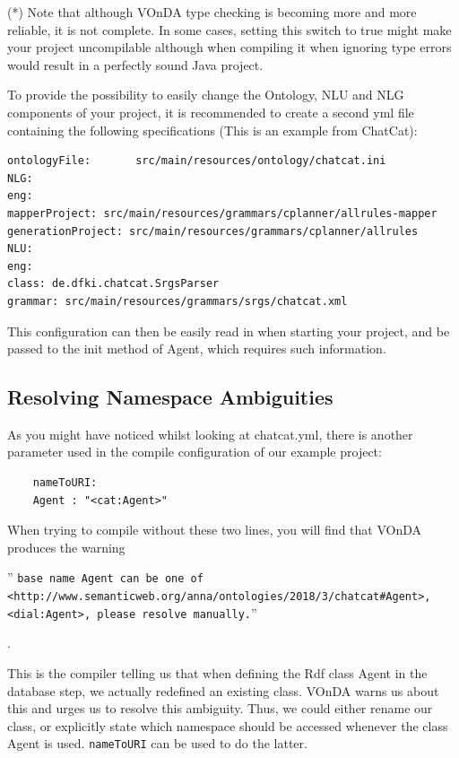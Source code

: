\documentclass[a4paper]{report}
\newcommand{\vonda}{VOnDA\xspace}
\begin{document}
(*) Note that although \vonda type checking is becoming more and more reliable,
it is not complete. In some cases, setting this switch to true might make your
project uncompilable although when compiling it when ignoring type errors would
result in a perfectly sound Java project.

To provide the possibility to easily change the Ontology, NLU and NLG
components of your project, it is recommended to create a second yml file
containing the following specifications (This is an example from ChatCat):

\begin{verbatim}
ontologyFile:       src/main/resources/ontology/chatcat.ini
NLG:
eng:
mapperProject: src/main/resources/grammars/cplanner/allrules-mapper
generationProject: src/main/resources/grammars/cplanner/allrules
NLU:
eng:
class: de.dfki.chatcat.SrgsParser
grammar: src/main/resources/grammars/srgs/chatcat.xml
\end{verbatim}

This configuration can then be easily read in when starting your project, and
be passed to the init method of Agent, which requires such information.

\subsection{Resolving Namespace Ambiguities}

As you might have noticed whilst looking at chatcat.yml, there is another
parameter used in the compile configuration of our example project:

\begin{verbatim}
	nameToURI:
	Agent : "<cat:Agent>"
\end{verbatim}

When trying to compile without these two lines, you will find that \vonda
produces the warning \begin{small}'' \texttt{base name Agent can be one of
    <http://www.semanticweb.org/anna/ontologies/2018/3/chatcat\#Agent>,
    <dial:Agent>, please resolve manually.}''
\end{small}.

This is the compiler telling us that when defining the Rdf class Agent in the
database step, we actually redefined an existing class. \vonda warns us about
this and urges us to resolve this ambiguity. Thus, we could either rename our
class, or explicitly state which namespace should be accessed whenever the
class Agent is used. \texttt{nameToURI} can be used to do the latter.
\end{document}
